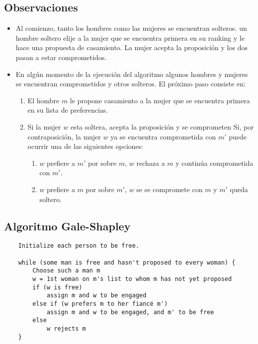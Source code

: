 \documentclass[12pt, fleqn]{article}
\theoremstyle{remark}
\theoremstyle{definition}
\begin{document}
\subsection{Observaciones}
\begin{itemize}
    \item Al comienzo, tanto los hombres como las mujeres se encuentran solteros.
            un hombre soltero elije a la mujer que se encuentra primera en su ranking
            y le hace una propuesta de casamiento.
            La mujer acepta la proposición y los dos pasan a estar comprometidos.
    \item En algún momento de la ejecución del algoritmo algunos hombres y mujeres
            se encuentran comprometidos y otros solteros. El próximo paso consiste en:
            \begin{enumerate}
                \item El hombre $m$ le propone casamiento a la mujer que se encuentra
                        primera en su lista de preferencias.
                \item Si la mujer $w$ esta soltera, acepta la proposición y se comprometen
                        Si, por contraposición, la mujer $w$ ya se encuentra comprometida
                        con $m'$ puede ocurrir una de las siguientes opciones:
                        \begin{enumerate}
                            \item $w$ prefiere a $m'$ por sobre $m$, $w$ rechaza
                                    a $m$ y continúa comprometida con $m'$.
                            \item $w$ prefiere a $m$ por sobre $m'$, $w$ se
                                    se compromete con $m$ y $m'$ queda soltero.        
                        \end{enumerate}
            \end{enumerate}
\end{itemize}
\subsection{Algoritmo Gale-Shapley}
\begin{verbatim}
    Initialize each person to be free.

    while (some man is free and hasn't proposed to every woman) {
        Choose such a man m
        w = 1st woman on m's list to whom m has not yet proposed
        if (w is free)
            assign m and w to be engaged
        else if (w prefers m to her fiancé m')
            assign m and w to be engaged, and m' to be free
        else
            w rejects m
    }
\end{verbatim}
\end{document}
